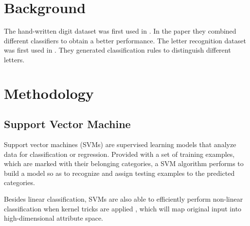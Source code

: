 \documentclass[11pt]{article}
\begin{document}
\section{Background}
The hand-written digit dataset was first used in \cite{kaynak1995methods}. In the paper they combined different classifiers to obtain a better performance.  The letter recognition dataset was first used in \cite{frey1991letter}. They generated classification rules to distinguish different letters.



\section{Methodology}\label{sec:metho}

\subsection{Support Vector Machine}
Support vector machines (SVMs) \cite{cortes1995support} are supervised learning models that analyze data for classification or regression. Provided with a set of training examples, which are marked with their belonging categories, a SVM algorithm performs to build a model so as to recognize and assign testing examples to the predicted categories. 

Besides linear classification, SVMs are also able to efficiently perform non-linear classification when kernel tricks are applied\cite{boser1992training} , which will map original input into high-dimensional attribute space.
\end{document}
